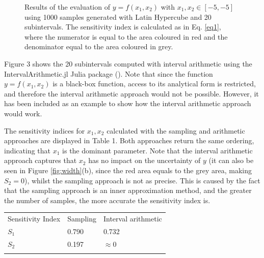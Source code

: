 \documentclass[twocolumn]{rps-esrel2022}
\begin{document}
\begin{figure}[!b]
	\caption{Results of the evaluation of $y=f(x_1,x_2)$ with $x_1,x_2 \in [-5,-5]$ using 1000 samples generated with Latin Hypercube and 20 subintervals.
	The sensitivity index is calculated as in Eq. \ref{eq1}, where the numerator is equal to the area coloured in red and the denominator
	equal to the area coloured in grey.}
	\label{fig:myfig1}
\end{figure}

Figure 3 shows the 20 subintervals computed with interval arithmetic using the IntervalArithmetic.jl Julia package (\cite{benet2020juliaintervals}).
Note that since the function $y = f(x_1,x_2)$ is a black-box function, access to its analytical form is restricted, and therefore the interval arithmetic approach would not be possible. However, it has been included as an example to show how the interval arithmetic approach would work.

The sensitivity indices for $x_1,x_2$ calculated with the sampling and arithmetic approaches are displayed in Table 1.
Both approaches return the same ordering, indicating that $x_1$ is the dominant parameter.
Note that the interval arithmetic approach captures that $x_2$ has no impact on the uncertainty of $y$ (it can  also be seen in Figure \ref{fig:width}(b), since the
red area equals to the grey area, making $S_2 = 0$), whilst the sampling approach is not as precise.
This is caused by the fact that the sampling approach is an inner approximation method, and the greater the number of samples, the more accurate the sensitivity index is.

\begin{table}[!h]
	{
	\begin{tabular}{@{}lll@{}}\toprule 
	Sensitivity Index  & Sampling  & Interval arithmetic\\
\colrule

	$S_1$ & 0.790 & 0.732\\
	$S_2$ & 0.197 & $\approx 0$\\
\botrule
	\end{tabular}}

\end{table}
\end{document}
